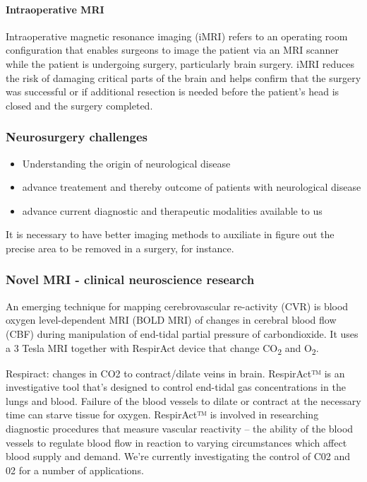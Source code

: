\documentclass[12pt,article,oneside,a4paper]{memoir}
\begin{document}
\paragraph{Intraoperative MRI}
Intraoperative magnetic resonance imaging (iMRI) refers to an operating room
configuration that enables surgeons to image the patient via an MRI scanner while
the patient is undergoing surgery, particularly brain surgery. iMRI reduces the
risk of damaging critical parts of the brain and helps confirm that the surgery
was successful or if additional resection is needed before the patient’s head
is closed and the surgery completed.

\subsubsection{Neurosurgery challenges} 

\begin{itemize}
\item Understanding the origin of neurological disease
\item advance treatement and thereby outcome of patients with neurological disease
\item advance current diagnostic and therapeutic modalities available to us
\end{itemize}

It is necessary to have better imaging methods to auxiliate in figure out the
precise area to be removed in a surgery, for instance.

\subsubsection{Novel MRI - clinical neuroscience research}
An emerging technique for mapping cerebrovascular re-activity (CVR) is blood
oxygen level-dependent MRI (BOLD MRI) of changes in cerebral blood flow (CBF)
during manipulation of end-tidal partial pressure of carbondioxide. It uses a
3 Tesla MRI together with RespirAct device that change CO\textsubscript{2} and
O\textsubscript{2}.

Respiract: changes in CO2 to contract/dilate veins in brain. RespirAct™ is an
investigative tool that’s designed to control end-tidal gas concentrations in
the lungs and blood. Failure of the blood vessels to dilate or contract at the
necessary time can starve tissue for oxygen. RespirAct™ is involved in researching
diagnostic procedures that measure vascular reactivity – the ability of the blood
vessels to regulate blood flow in reaction to varying circumstances which affect
blood supply and demand. We’re currently investigating the control of C02 and 02
for a number of applications. 
\end{document}
